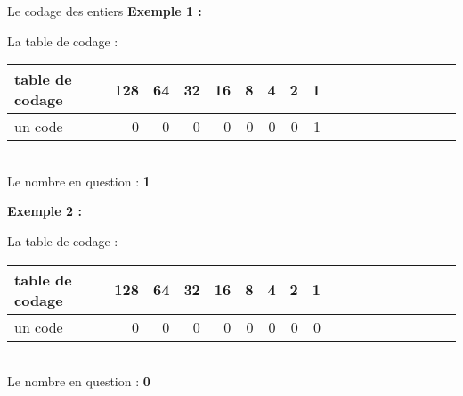 \begin{frame}{Le codage des entiers}
    \textbf{Exemple 1 :}
    \begin{center}
        La table de codage : \\
        $\;$\\
        \begin{tabular}{|*{2}{l||r|r|r|r|r|r|r|r|}}
            \hline
                table de codage & 128 & 64 & 32 & 16 & 8 & 4 & 2 & 1 \\
            \hline
                un code         & 0   & 0  & 0  & 0  & 0 & 0 & 0 & 1 \\
            \hline
        \end{tabular} \\
        $\;$\\
        Le nombre en question : \textbf{1} \\
    \end{center}
    \textbf{Exemple 2 :}
    \begin{center}
        La table de codage : \\
        $\;$\\
        \begin{tabular}{|*{2}{l||r|r|r|r|r|r|r|r|}}
            \hline
                table de codage & 128 & 64 & 32 & 16 & 8 & 4 & 2 & 1 \\
            \hline
                un code         & 0   & 0  & 0  & 0  & 0 & 0 & 0 & 0 \\
            \hline
        \end{tabular} \\
        $\;$\\
        Le nombre en question : \textbf{0} \\
    \end{center}
\end{frame}

